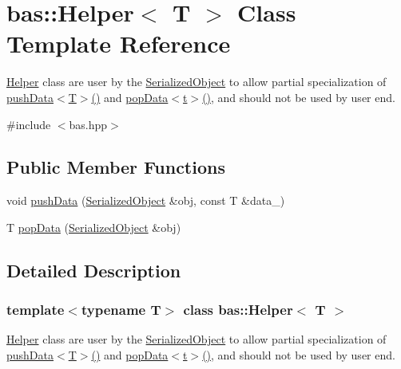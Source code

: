 \hypertarget{classbas_1_1Helper}{}\section{bas\+::Helper$<$ T $>$ Class Template Reference}
\label{classbas_1_1Helper}


\mbox{\hyperlink{classbas_1_1Helper}{Helper}} class are user by the \mbox{\hyperlink{classbas_1_1SerializedObject}{Serialized\+Object}} to allow partial specialization of \mbox{\hyperlink{classbas_1_1Helper_a14a82ecc9aa2a8580322f63dc7afde50}{push\+Data$<$\+T$>$()}} and \mbox{\hyperlink{classbas_1_1Helper_a44946c3423be62b6f70556c1792bbc12}{pop\+Data$<$t$>$()}}, and should not be used by user end.  




{\ttfamily \#include $<$bas.\+hpp$>$}

\subsection*{Public Member Functions}
\begin{DoxyCompactItemize}
\item 
void \mbox{\hyperlink{classbas_1_1Helper_a14a82ecc9aa2a8580322f63dc7afde50}{push\+Data}} (\mbox{\hyperlink{classbas_1_1SerializedObject}{Serialized\+Object}} \&obj, const T \&data\+\_\+)
\item 
T \mbox{\hyperlink{classbas_1_1Helper_a44946c3423be62b6f70556c1792bbc12}{pop\+Data}} (\mbox{\hyperlink{classbas_1_1SerializedObject}{Serialized\+Object}} \&obj)
\end{DoxyCompactItemize}


\subsection{Detailed Description}
\subsubsection*{template$<$typename T$>$\newline
class bas\+::\+Helper$<$ T $>$}

\mbox{\hyperlink{classbas_1_1Helper}{Helper}} class are user by the \mbox{\hyperlink{classbas_1_1SerializedObject}{Serialized\+Object}} to allow partial specialization of \mbox{\hyperlink{classbas_1_1Helper_a14a82ecc9aa2a8580322f63dc7afde50}{push\+Data$<$\+T$>$()}} and \mbox{\hyperlink{classbas_1_1Helper_a44946c3423be62b6f70556c1792bbc12}{pop\+Data$<$t$>$()}}, and should not be used by user end. 

